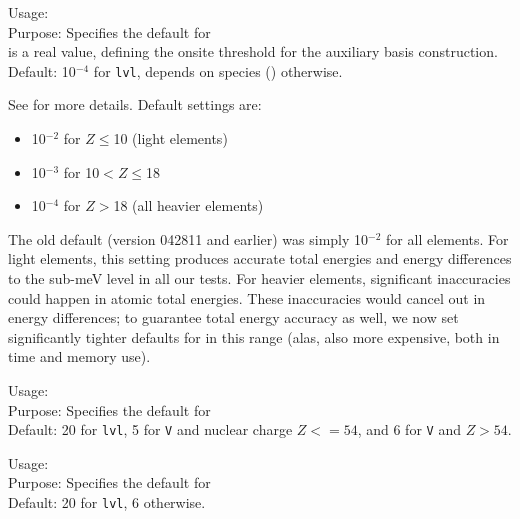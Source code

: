 %
{ \noindent %
  Usage:   \\[1.0ex]
  Purpose: Specifies the default for \\[1.0ex]
   is a real value, defining the onsite threshold for the
  auxiliary basis construction.\\
  Default: 10$^{-4}$ for  \texttt{lvl}, depends on species
  () otherwise.  
}

See  for more details. Default settings are:
\begin{itemize}
  \item 10$^{-2}$ for $Z \le$10 (light elements)
  \item 10$^{-3}$ for 10$< Z \le$18
  \item 10$^{-4}$ for $Z >$18 (all heavier elements)
\end{itemize}
The old default (version 042811 and earlier) was simply 10$^{-2}$ for
all elements. For light elements, this setting produces accurate total
energies and energy differences to the sub-meV level in all our
tests. For heavier elements, significant inaccuracies could happen in
atomic total energies. These inaccuracies would cancel out in energy
differences; to guarantee total energy accuracy as well, we now set
significantly tighter defaults for 
in this range (alas, also more expensive, both in time and memory use).

%
{ \noindent %
  Usage:   \\[1.0ex]
  Purpose: Specifies the default for
  \\[1.0ex]
  Default: 20 for  \texttt{lvl}, 5 for  \texttt{V} and
    nuclear charge $Z<=54$, and 6 for  \texttt{V} and $Z>54$.  }

%
{ \noindent %
  Usage:   \\[1.0ex]
  Purpose: Specifies the default for
  \\[1.0ex]
  Default: 20 for  \texttt{lvl}, 6 otherwise.
}

